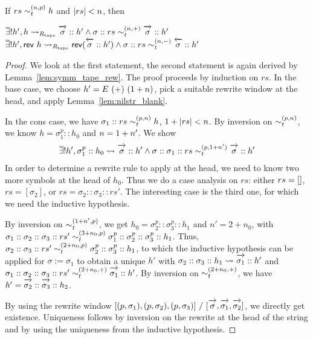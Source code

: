 \begin{lemma}\label{lem:tape_add}
  If $rs \sim_t^{(n, p)} h$ and $|rs| < n$, then 
  \begin{enumerate}
     $\mexists h', h \strent{\Rtape} \polpos{\sigma} :: h' \land \sigma :: rs \reprtt{n}{+} \polpos{\sigma} :: h'$ 
     $\mexists h', \rev~h \strent{\Rtape} \rev{(\polneg{\sigma} :: h')} \land \sigma :: rs \reprtt{n}{-} \polneg{\sigma} :: h'$
  \end{enumerate}
\end{lemma}
\begin{proof}
  We look at the first statement, the second statement is again derived by Lemma~\ref{lem:symm_tape_rew}. 
  The proof proceeds by induction on $rs$. In the base case, we choose $h' = E~(+)~(1 +{n})$, pick a suitable rewrite window at the head, and apply Lemma~\ref{lem:nilstr_blank}. 

  In the cons case, we have $\sigma_1 :: rs \sim_t^{(p, n)} h$, $1 +{|rs|} < n$. By inversion on $\sim_t^{(p, n)}$, we know $h = \sigma_1^p :: h_0$ and $n = 1 +{n'}$. We show 
  \begin{align*}
    \mexists h', \sigma_1^p :: h_0 \strent{} \polpos{\sigma} :: h' \land \sigma::\sigma_1 ::rs \reprtt{p}{\natS{n'}} \polpos{\sigma} :: h'  
  \end{align*}
  In order to determine a rewrite rule to apply at the head, we need to know two more symbols at the head of $h_0$. Thus we do a case analysis on $rs$: either $rs = []$, $rs = [\sigma_2]$, or $rs = \sigma_2 :: \sigma_3 :: rs'$. The interesting case is the third one, for which we need the inductive hypothesis. 

  By inversion on $\sim_t^{(1 +{n'}, p)}$, we get $h_0 = \sigma_2^p :: \sigma_3^p :: h_1$ and $n' = 2 + n_0$, with $\sigma_1 :: \sigma_2 :: \sigma_3 :: rs' \sim_t^{(3 + n_0, p)} \sigma_1^p :: \sigma_2^p :: \sigma_3^p :: h_1$. 
  Thus, $\sigma_2 :: \sigma_3 :: rs' \sim_t^{(2 + n_0, p)} \sigma_2^p :: \sigma_3^p :: h_1$, 
  to which the inductive hypothesis can be applied for $\sigma := \sigma_1$ to obtain a unique $h'$ 
  with $\sigma_2 :: \sigma_3 :: h_1 \strent{} \polpos{\sigma_1} :: h'$ and $\sigma_1 :: \sigma_2 :: \sigma_3 :: rs' \reprtt{2 + n_0}{+} \polpos{\sigma_1} :: h'$. By inversion on $\sim_t^{(2+n_0, +)}$, we have $h' = \polpos{\sigma_2} :: \polpos{\sigma_3} :: h_2$. 

  By using the rewrite window $\irewwin{(p, \sigma_1)}{(p, \sigma_2)}{(p, \sigma_3)}{\polpos{\sigma}}{\polpos{\sigma_1}}{\polpos{\sigma_2}}$, we directly get existence. 
  Uniqueness follows by inversion on the rewrite at the head of the string and by using the uniqueness from the inductive hypothesis.
\end{proof}

